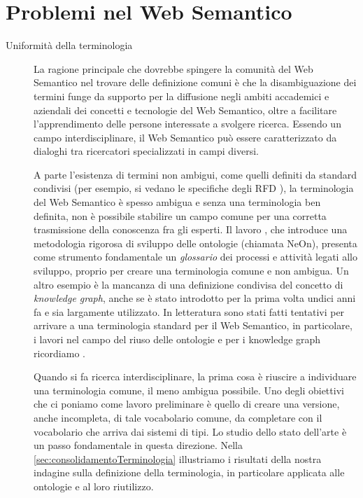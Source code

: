 \section{Problemi nel Web Semantico}
\label{sec:consolidamentoTerminologia}
\begin{description}
	\item[Uniformità della terminologia] La ragione principale che dovrebbe spingere la comunità del Web Semantico nel trovare delle definizione comuni è che la disambiguazione dei termini funge da supporto per la diffusione negli ambiti accademici e aziendali dei concetti e tecnologie del Web Semantico, oltre a facilitare l'apprendimento delle persone interessate a svolgere ricerca. Essendo un campo interdisciplinare, il Web Semantico può essere caratterizzato da dialoghi tra ricercatori specializzati in campi diversi.
	
	A parte l'esistenza di termini non ambigui, come quelli definiti da standard condivisi (per esempio, si vedano le specifiche degli RFD \cite{RDFspecification}), la terminologia del Web Semantico è spesso ambigua e senza una terminologia ben definita, non è possibile stabilire un campo comune per una corretta trasmissione della conoscenza fra gli esperti. Il lavoro \cite{NeOn}, che introduce una metodologia rigorosa di sviluppo delle ontologie (chiamata NeOn), presenta come strumento fondamentale un \emph{glossario} dei processi e attività legati allo sviluppo, proprio per creare una terminologia comune e non ambigua.  Un altro esempio è la mancanza di una definizione condivisa del concetto di \textit{knowledge graph}, anche se è stato introdotto per la prima volta undici anni fa e sia largamente utilizzato. In letteratura sono stati fatti tentativi per arrivare a una terminologia standard per il Web Semantico, in particolare, i lavori \cite{katsumi2018ontology, goy2015ontologies, NeOn} nel campo del riuso delle ontologie e per i knowledge graph ricordiamo \cite{ehrlinger2016towards}. 
	
	Quando si fa ricerca interdisciplinare, la prima cosa è riuscire a individuare una terminologia comune, il meno ambigua possibile. Uno degli obiettivi che ci poniamo come lavoro preliminare è quello di creare una versione, anche incompleta, di tale vocabolario comune, da completare con il vocabolario che arriva dai sistemi di tipi. Lo studio dello stato dell'arte è un passo fondamentale in questa direzione. Nella \autoref{sec:consolidamentoTerminologia} illustriamo i risultati della nostra indagine sulla definizione della terminologia, in particolare applicata alle ontologie e al loro riutilizzo.
	

\end{description}
